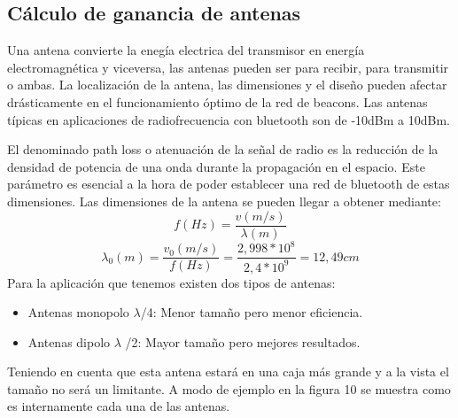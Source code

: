 \documentclass[a4paper ,12pt, onecolumn]{article}
\begin{document}
    \subsection{Cálculo de ganancia de antenas}
            Una antena convierte la enegía electrica del transmisor en energía electromagnética y viceversa, las antenas pueden ser 
            para recibir, para transmitir o ambas. La localización de la antena, las dimensiones y el diseño pueden afectar drásticamente
            en el funcionamiento óptimo de la red de beacons. 
            Las antenas típicas en aplicaciones de radiofrecuencia con bluetooth son de -10dBm a 10dBm.

            El denominado path loss o atenuación de la señal de radio es la reducción de la densidad de potencia de una onda durante la 
            propagación en el espacio. Este parámetro es esencial a la hora de poder establecer una red de bluetooth de estas dimensiones.
            Las dimensiones de la antena se pueden llegar a obtener mediante:
            \begin{equation}
                f(Hz)=\frac{v(m/s)}{\lambda(m)}
            \end{equation}
            \begin{equation}
                \lambda_0(m)=\frac{v_0(m/s)}{f(Hz)} = \frac{2,998*10^8}{2,4*10^9} = 12,49 cm
            \end{equation}
            Para la aplicación que tenemos existen dos tipos de antenas:
            \begin{itemize}
                \item  Antenas monopolo $\lambda$/4: Menor tamaño pero menor eficiencia. 
                \item  Antenas dipolo $\lambda$ /2: Mayor tamaño pero mejores resultados.
            \end{itemize}
            Teniendo en cuenta que esta antena estará en una caja más grande y a la vista el tamaño no será un limitante.
            A modo de ejemplo en la figura 10 se muestra como es internamente cada una de las antenas.
\end{document}
